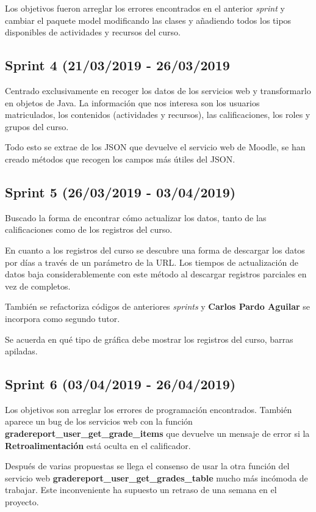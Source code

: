 Los objetivos fueron arreglar los errores encontrados en el anterior \textit{sprint} y cambiar el paquete model modificando las clases y añadiendo todos los tipos disponibles de actividades y recursos del curso.

\subsection{Sprint 4 (21/03/2019 - 26/03/2019}

Centrado exclusivamente en recoger los datos de los servicios web y transformarlo en objetos de Java. La información que nos interesa son los usuarios matriculados, los contenidos (actividades y recursos), las calificaciones, los roles y grupos del curso.

Todo esto se extrae de los JSON que devuelve el servicio web de Moodle, se han creado métodos que recogen los campos más útiles del JSON.

\subsection{Sprint 5 (26/03/2019 - 03/04/2019)}

Buscado la forma de encontrar cómo actualizar los datos, tanto de las calificaciones como de los registros del curso.

En cuanto a los registros del curso se descubre una forma de descargar los datos por días a través de un parámetro de la URL. Los tiempos de actualización de datos baja considerablemente con este método al descargar registros parciales en vez de completos.

También se refactoriza códigos de anteriores \textit{sprints} y \textbf{Carlos Pardo Aguilar} se incorpora como segundo tutor.

Se acuerda en qué tipo de gráfica debe mostrar los registros del curso, barras apiladas.

\subsection{Sprint 6 (03/04/2019 - 26/04/2019)}

Los objetivos son arreglar los errores de programación encontrados. También aparece un bug de los servicios web con la función \textbf{gradereport\_user\_get\_grade\_items} que devuelve un mensaje de error si la \textbf{Retroalimentación} está oculta en el calificador.

Después de varias propuestas se llega el consenso de usar la otra función 
del servicio web \textbf{gradereport\_user\_get\_grades\_table} mucho más incómoda de trabajar. Este inconveniente ha supuesto un retraso de una semana en el proyecto.

